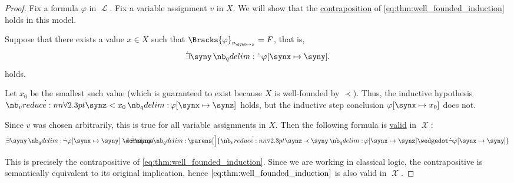 \begin{proof}
  Fix a formula \( \varphi \) in \( \mscrL \). Fix a variable assignment \( v \) in \( X \). We will show that the \hyperref[def:conditional_formula/contrapositive]{contraposition} of \eqref{eq:thm:well_founded_induction} holds in this model.

  Suppose that there exists a value \( x \in X \) such that \( \Bracks{\varphi}_{v_{\synx \mapsto x}} = F \), that is,
  \begin{equation*}
    \qexists \syny \synneg \varphi[\synx \mapsto \syny].
  \end{equation*}
  holds.

  Let \( x_0 \) be the smallest such value (which is guaranteed to exist because \( X \) is well-founded by \( \prec \)). Thus, the inductive hypothesis \( \qforall {\synz < x_0} \varphi[\synx \mapsto \synz] \) holds, but the inductive step conclusion \( \varphi[\synx \mapsto x_0] \) does not.

  Since \( v \) was chosen arbitrarily, this is true for all variable assignments in \( X \). Then the following formula is \hyperref[def:first_order_model]{valid} in \( \mscrX \):
  \begin{equation}\label{eq:thm:well_founded_induction/contraposition}
    \qexists \syny \synneg \varphi[\synx \mapsto \syny]
    \synimplies
    \qexists \syny
    \parens[\Big]
      {
        \qforall {\synz \prec \syny} \varphi[\synx \mapsto \synz] \synwedge \synneg \varphi[\synx \mapsto \syny]
      }
  \end{equation}

  This is precisely the contrapositive of \eqref{eq:thm:well_founded_induction}. Since we are working in classical logic, the contrapositive is semantically equivalent to its original implication, hence \( \eqref{eq:thm:well_founded_induction} \) is also valid in \( \mscrX \).
\end{proof}

